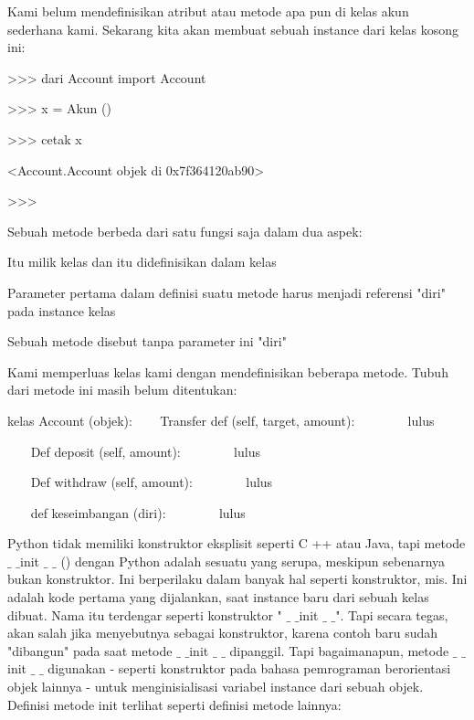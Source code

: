 {Kami belum mendefinisikan atribut atau metode apa pun di kelas akun sederhana kami. Sekarang kita akan membuat sebuah instance dari kelas kosong ini: \par
\vspace{12pt}
\vspace{12pt}
\vspace{12pt}
\vspace{12pt}
\noindent 
>>> dari Account import Account \par
\noindent 
>>> x = Akun () \par
\noindent 
>>> cetak x \par
\noindent 
<Account.Account objek di 0x7f364120ab90> \par
\noindent 
>>> \par
\vspace{12pt}
\noindent 
Sebuah metode berbeda dari satu fungsi saja dalam dua aspek: \par
\noindent 
Itu milik kelas dan itu didefinisikan dalam kelas \par
\noindent 
Parameter pertama dalam definisi suatu metode harus menjadi referensi "diri" pada instance kelas \par
\noindent 
Sebuah metode disebut tanpa parameter ini "diri" \par
\vspace{12pt}
Kami memperluas kelas kami dengan mendefinisikan beberapa metode. Tubuh dari metode ini masih belum ditentukan: \par
\vspace{12pt}
\noindent 
kelas Account (objek):
\vspace{12pt}
\noindent 
~~~ Transfer def (self, target, amount):
\noindent 
~~~~~~~ lulus 
\noindent 
  
\noindent
~~~ Def deposit (self, amount):
\noindent 
~~~~~~~ lulus
\noindent 
  \par
\noindent 
~~~ Def withdraw (self, amount):
\noindent 
~~~~~~~ lulus 
\noindent 
  \par
\noindent 
~~~ def keseimbangan (diri):
\noindent 
~~~~~~~ lulus
\vspace{12pt}
\noindent 

Python tidak memiliki konstruktor eksplisit seperti C ++ atau Java, tapi metode  $  \_  $ $  \_  $init  $  \_  $ $  \_  $ () dengan Python adalah sesuatu yang serupa, meskipun sebenarnya bukan konstruktor. Ini berperilaku dalam banyak hal seperti konstruktor, mis. Ini adalah kode pertama yang dijalankan, saat instance baru dari sebuah kelas dibuat. Nama itu terdengar seperti konstruktor " $  \_  $ $  \_  $init $  \_  $ $  \_  $". Tapi secara tegas, akan salah jika menyebutnya sebagai konstruktor, karena contoh baru sudah "dibangun" pada saat metode  $  \_  $ $  \_  $init $  \_  $ $  \_  $ dipanggil. Tapi bagaimanapun, metode  $  \_  $ $  \_  $init $  \_  $ $  \_  $ digunakan - seperti konstruktor pada bahasa pemrograman berorientasi objek lainnya - untuk menginisialisasi variabel instance dari sebuah objek. Definisi metode init terlihat seperti definisi metode lainnya:
\vspace{12pt}

}
